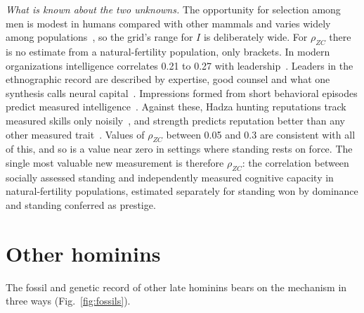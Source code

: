 \emph{What is known about the two unknowns.} The opportunity for selection among men is modest in humans compared with
other mammals and varies widely among populations~\cite{ross2023,brown2009}, so the grid's range for $I$ is deliberately
wide. For $\rho_{ZC}$ there is no estimate from a natural-fertility population, only brackets. In modern organizations
intelligence correlates 0.21 to 0.27 with leadership~\cite{judge2004}. Leaders in the ethnographic record are described by
expertise, good counsel and what one synthesis calls neural capital~\cite{garfield2019}. Impressions formed from short
behavioral episodes predict measured intelligence~\cite{borkenau2004}. Against these, Hadza hunting reputations track measured
skills only noisily~\cite{stibbardhawkes2018}, and strength predicts reputation better than any other measured
trait~\cite{apicella2014}. Values of $\rho_{ZC}$ between 0.05 and 0.3 are consistent with all of this, and so is a value near
zero in settings where standing rests on force. The single most valuable new measurement is therefore $\rho_{ZC}$: the
correlation between socially assessed standing and independently measured cognitive capacity in natural-fertility
populations, estimated separately for standing won by dominance and standing conferred as prestige.

\section{Other hominins}\label{sec:hominins}

\noindent The fossil and genetic record of other late hominins bears on the mechanism in three ways (Fig.~\ref{fig:fossils}).

